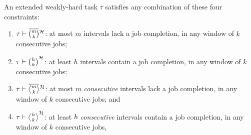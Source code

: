 \begin{definition}%
    \label{def:new-mk}%
    An extended weakly-hard task $\tau$ satisfies any combination of these four constraints:
    \begin{enumerate}[label=(\roman*)]
        \item $\tau \vdash \overbar{\binom{m}{k}}^{\strat}$: at most $m$ intervals lack a job completion, in any window of $k$ consecutive jobs;
        \item $\tau \vdash \binom{h}{\!\:\!\:k\!\:\!\:}^{\mathcal{H}}$: at least $h$ intervals contain a job completion, in any window of $k$ consecutive jobs;
        \item $\tau \vdash \overbar{\genfrac{<}{>}{0pt}{}{m}{\!\:\!\:k\!\:\!\:}}^{\strat}$: at most $m$ \emph{consecutive} intervals lack a job completion, in any window of $k$ consecutive jobs; and
        \item $\tau \vdash \genfrac{<}{>}{0pt}{}{h}{\!\:\!\:k\!\:\!\:}^{\strat}$: at least $h$ \emph{consecutive} intervals contain a job completion, in any window of $k$ consecutive jobs,
    \end{enumerate}
\end{definition}

